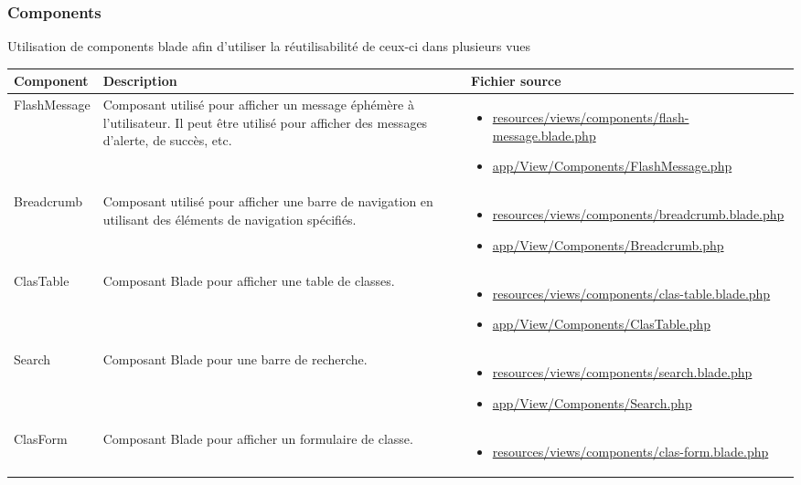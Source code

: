 \subsubsection{Components}

Utilisation de components blade afin d'utiliser la réutilisabilité de ceux-ci dans plusieurs vues \\

\begin{table}[H]
	\begin{adjustbox}{width=\textwidth}
		\begin{tabular}{|l|p{}|p{}|}
			\hline
			\textbf{Component} & \textbf{Description} & \textbf{Fichier source} \\
			\hline
			FlashMessage & Composant utilisé pour afficher un message éphémère à l'utilisateur. Il peut être utilisé pour afficher des messages d'alerte, de succès, etc. & \begin{itemize}
				\item \url{resources/views/components/flash-message.blade.php}
				\item \url{app/View/Components/FlashMessage.php}
			\end{itemize} \\
			Breadcrumb 	& Composant utilisé pour afficher une barre de navigation en utilisant des éléments de navigation spécifiés. & \begin{itemize}
				\item \url{resources/views/components/breadcrumb.blade.php}
				\item \url{app/View/Components/Breadcrumb.php} 
			\end{itemize} \\
			ClasTable 	& Composant Blade pour afficher une table de classes. 		& \begin{itemize}
				\item \url{resources/views/components/clas-table.blade.php}
				\item \url{app/View/Components/ClasTable.php} 
			\end{itemize} \\
			Search 			& Composant Blade pour une barre de recherche. 	& 
			\begin{itemize}\item \url{resources/views/components/search.blade.php}
				\item \url{app/View/Components/Search.php} \end{itemize} \\
			ClasForm 		& Composant Blade pour afficher un formulaire de classe. 														& \begin{itemize}\item \url{resources/views/components/clas-form.blade.php}

\end{itemize}
\end{tabular}
\end{adjustbox}
\end{table}

